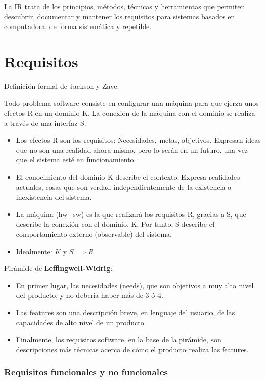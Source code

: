 

La IR trata de los principios, métodos, técnicas y herramientas que
permiten descubrir, documentar y mantener los requisitos para sistemas
basados en computadora, de forma sistemática y repetible.

\section{Requisitos}

Definición formal de Jackson y Zave:

Todo problema software consiste en configurar una máquina para que ejerza unos efectos R en
un dominio K. La conexión de la máquina con el dominio se realiza a través de una interfaz S.

\begin{itemize}[noitemsep]
\item Los efectos R son los requisitos: Necesidades, metas,
  objetivos. Expresan ideas que no son una realidad ahora mismo, pero
  lo serán en un futuro, una vez que el sistema esté en
  funcionamiento.
\item El conocimiento del dominio K describe el contexto. Expresa
  realidades actuales, cosas que son verdad independientemente de la
  existencia o inexistencia del sistema.
\item La máquina (hw+sw) es la que realizará los requisitos R, gracias
  a S, que describe la conexión con el dominio.  K. Por tanto, S
  describe el comportamiento externo (observable) del sistema.
\item Idealmente: $K$ y $S \implies R$
\end{itemize}

Pirámide de \textbf{Leffingwell-Widrig}:
\begin{itemize}[noitemsep]
\item En primer lugar, las necesidades (needs), que son
objetivos a muy alto nivel del producto, y no debería
haber más de 3 ó 4.
\item Las features son una descripción breve, en lenguaje del
usuario, de las capacidades de alto nivel de un producto.
\item Finalmente, los requisitos software, en la base de la
pirámide, son descripciones más técnicas acerca de cómo
el producto realiza las features.
\end{itemize}


\subsubsection{Requisitos funcionales y no funcionales}
\label{sec:requisitos:funcionales-nofuncionales}

